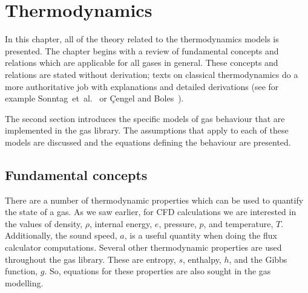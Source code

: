 \chapter{Thermodynamics}
\label{chap:thermo}

In this chapter, all of the theory related to the thermodynamics models
is presented.
The chapter begins with a review of fundamental concepts and relations
which are applicable for all gases in general.
These concepts and relations are stated without derivation;
texts on classical thermodynamics do a more authoritative job
with explanations and detailed derivations (see for example
Sonntag~et~al.~\cite{sonntag_etal_1998} or
\c{C}engel and Boles~\cite{cengel_boles_1998}).

The second section introduces the specific models
of gas behaviour that are implemented in the gas library.
The assumptions that apply to each of these models
are discussed and the equations defining the 
behaviour are presented.

\section{Fundamental concepts}

There are a number of thermodynamic properties which can be used
to quantify the state of a gas.
As we saw earlier, for CFD calculations we are interested in the
values of density, $\rho$, internal energy, $e$, pressure, $p$, 
and temperature, $T$.
Additionally, the sound speed, $a$, is a useful quantity when doing
the flux calculator computations.
Several other thermodynamic properties are used throughout the
gas library.
These are entropy, $s$, enthalpy, $h$, and the Gibbs function, $g$.
So, equations for these properties are also sought in the gas modelling.

